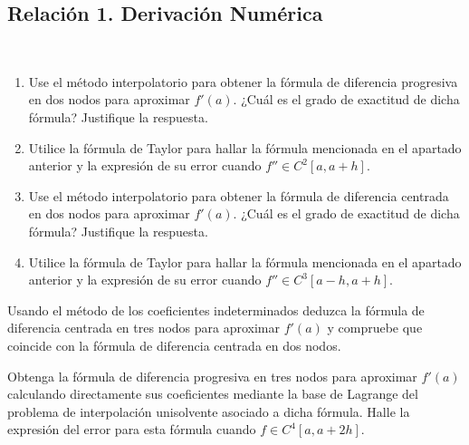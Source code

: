 \subsection{Relación 1. Derivación Numérica}
\setcounter{ejercicio}{0}


\begin{ejercicio}\label{ej:2.1.1}~
    \begin{enumerate}
        \item Use el método interpolatorio para obtener la fórmula de diferencia progresiva en dos nodos para aproximar $f'(a)$. ¿Cuál es el grado de exactitud de dicha fórmula? Justifique la respuesta.
        
        \item Utilice la fórmula de Taylor para hallar la fórmula mencionada en el apartado anterior y la expresión de su error cuando $f'' \in C^2[a, a + h]$.
        
        \item Use el método interpolatorio para obtener la fórmula de diferencia centrada en dos nodos para aproximar $f'(a)$. ¿Cuál es el grado de exactitud de dicha fórmula? Justifique la respuesta.
        
        \item Utilice la fórmula de Taylor para hallar la fórmula mencionada en el apartado anterior y la expresión de su error cuando $f'' \in C^3[a - h, a + h]$.
    \end{enumerate}    
\end{ejercicio}

\begin{ejercicio}\label{ej:2.1.2}
    Usando el método de los coeficientes indeterminados deduzca la fórmula de diferencia centrada en tres nodos para aproximar $f'(a)$ y compruebe que coincide con la fórmula de diferencia centrada en dos nodos.
\end{ejercicio}

\begin{ejercicio}\label{ej:2.1.3}
    Obtenga la fórmula de diferencia progresiva en tres nodos para aproximar $f'(a)$ calculando directamente sus coeficientes mediante la base de Lagrange del problema de interpolación unisolvente asociado a dicha fórmula. Halle la expresión del error para esta fórmula cuando $f \in C^4[a, a + 2h]$.
\end{ejercicio}

